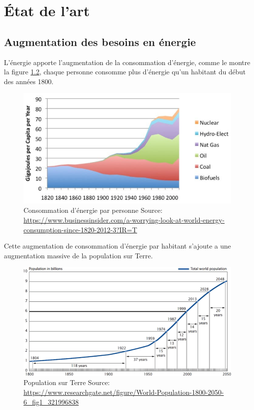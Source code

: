 \chapter{État de l’art}
\section{Augmentation des besoins en énergie}

L'énergie apporte l'augmentation de la consommation d'énergie, comme le montre la figure
\ref{fig:capita_energy}, chaque personne consomme plus d'énergie qu'un habitant
du début des années 1800.

\begin{figure}
  \centering
  \includegraphics[scale=0.35]{media/world_per_capita_energy.jpeg}
  \caption{
      Consommation d'énergie par personne\newline
      \tiny{Source:\newline
        \url{https://www.businessinsider.com/a-worrying-look-at-world-energy-consumption-since-1820-2012-3?IR=T}
      }
  }
  \label{fig:capita_energy}
\end{figure}

Cette augmentation de consommation d'énergie par habitant
s'ajoute a une augmentation massive de la population sur Terre.

\begin{figure}
  \centering
  \includegraphics[scale=0.35]{media/WorldPopulation.png}
  \caption{
      Population sur Terre\newline
      \tiny{Source:\newline
        \url{https://www.researchgate.net/figure/World-Population-1800-2050-6_fig1_321996838}
      }
  }
  \label{fig:capita_energy}
\end{figure}

